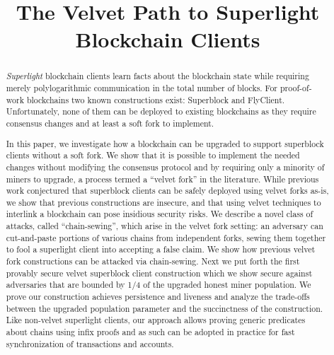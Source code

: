 \documentclass[sigconf, anonymous]{acmart}
\theoremstyle{plain}
\theoremstyle{definition}
\begin{document}
\title{%
The Velvet Path to Superlight Blockchain Clients
} %

\begin{abstract}
{\em Superlight} blockchain clients
learn facts about the blockchain state
while requiring merely polylogarithmic communication in the total 
number of blocks. 
%
For proof-of-work blockchains %
two known constructions exist: Superblock and FlyClient. 
%
Unfortunately, none of them can be deployed to existing blockchains as  they require consensus changes  and at least a soft fork to implement.

In this paper, we %
investigate how a blockchain can be upgraded to support superblock clients without a soft fork. We show that it is possible to implement the needed changes without modifying the consensus protocol and by requiring only a minority of miners to upgrade, a process termed a ``velvet fork'' in the literature. While previous work conjectured that superblock clients can be safely deployed using velvet forks as-is, we show that previous constructions are insecure, and that using velvet techniques to interlink a blockchain can pose insidious security risks. We describe a novel class of attacks, called  ``chain-sewing'', which arise in the velvet fork setting: an adversary can cut-and-paste portions of various chains from independent forks, sewing them together to 
fool a superlight client into accepting a false claim.
We show how previous velvet fork constructions can be attacked via chain-sewing. 
%
Next we put forth the first provably secure velvet superblock client construction which we show  secure against adversaries that are bounded by 1/4 of the upgraded honest miner population. We prove our construction achieves persistence and liveness and analyze the trade-offs between the upgraded population parameter and the succinctness of the construction. Like non-velvet superlight clients, our approach allows proving generic predicates about chains using infix proofs and as such can be adopted in practice for fast synchronization of transactions and accounts.
\end{abstract}
\end{document}
